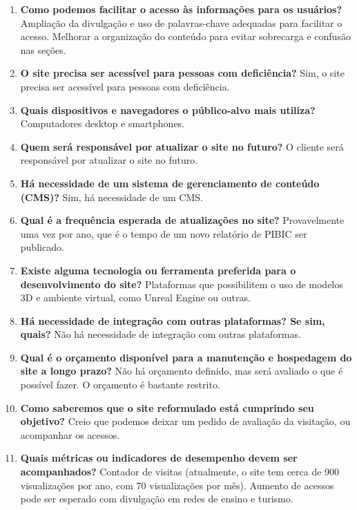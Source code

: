 \begin{enumerate}
    \item \textbf{Como podemos facilitar o acesso às informações para os usuários?}  
    Ampliação da divulgação e uso de palavras-chave adequadas para facilitar o acesso.  
    Melhorar a organização do conteúdo para evitar sobrecarga e confusão nas seções.

    \item \textbf{O site precisa ser acessível para pessoas com deficiência?}  
    Sim, o site precisa ser acessível para pessoas com deficiência.

    \item \textbf{Quais dispositivos e navegadores o público-alvo mais utiliza?}  
    Computadores desktop e smartphones.

    \item \textbf{Quem será responsável por atualizar o site no futuro?}  
    O cliente será responsável por atualizar o site no futuro.

    \item \textbf{Há necessidade de um sistema de gerenciamento de conteúdo (CMS)?}  
    Sim, há necessidade de um CMS.

    \item \textbf{Qual é a frequência esperada de atualizações no site?}  
    Provavelmente uma vez por ano, que é o tempo de um novo relatório de PIBIC ser publicado.

    \item \textbf{Existe alguma tecnologia ou ferramenta preferida para o desenvolvimento do site?}  
    Plataformas que possibilitem o uso de modelos 3D e ambiente virtual, como Unreal Engine ou outras.

    \item \textbf{Há necessidade de integração com outras plataformas? Se sim, quais?}  
    Não há necessidade de integração com outras plataformas.

    \item \textbf{Qual é o orçamento disponível para a manutenção e hospedagem do site a longo prazo?}  
    Não há orçamento definido, mas será avaliado o que é possível fazer. O orçamento é bastante restrito.

    \item \textbf{Como saberemos que o site reformulado está cumprindo seu objetivo?}  
    Creio que podemos deixar um pedido de avaliação da visitação, ou acompanhar os acessos.

    \item \textbf{Quais métricas ou indicadores de desempenho devem ser acompanhados?}  
    Contador de visitas (atualmente, o site tem cerca de 900 visualizações por ano, com 70 visualizações por mês).  
    Aumento de acessos pode ser esperado com divulgação em redes de ensino e turismo.
\end{enumerate}

